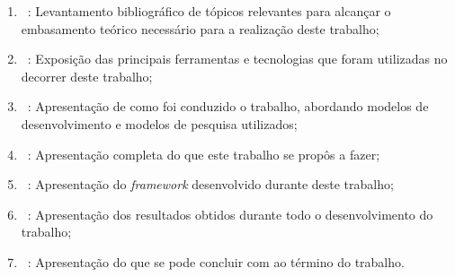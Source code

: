 \begin{enumerate}
	\item ~: Levantamento bibliográfico de tópicos relevantes para alcançar o embasamento teórico necessário para a realização deste trabalho;
	\item ~: Exposição das principais ferramentas e tecnologias que foram utilizadas no decorrer deste trabalho;
	\item ~: Apresentação de como foi conduzido o trabalho, abordando modelos de desenvolvimento e modelos de pesquisa utilizados;
	\item ~: Apresentação completa do que este trabalho se propôs a fazer;
	\item ~: Apresentação do \textit{framework} desenvolvido durante deste trabalho;
	\item ~: Apresentação dos resultados obtidos durante todo o desenvolvimento do trabalho;
	\item ~: Apresentação do que se pode concluir com ao término do trabalho.
\end{enumerate}
